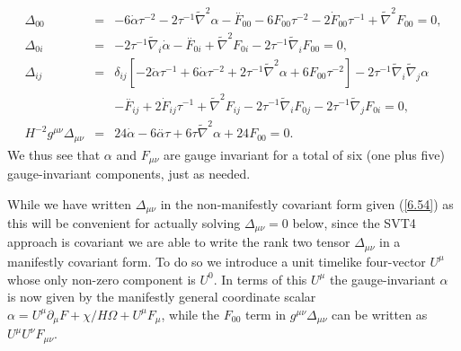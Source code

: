 \documentclass[aps,onecolumn,10pt]{revtex4}
\numberwithin{equation}{section}
\numberwithin{equation}{section}
\begin{document}
\begin{eqnarray}
\Delta_{00}&=& -6 \dot{\alpha} \tau^{-2} - 2 \tau^{-1} \tilde{\nabla}^2\alpha - \overset{..}{F}_{00}  - 6 F_{00} \tau^{-2} - 2 \dot{F}_{00} \tau^{-1} + \tilde{\nabla}^2F_{00}=0,
\nonumber\\ 
\Delta_{0i}&=& -2 \tau^{-1} \tilde{\nabla}_{i}\dot{\alpha}- \overset{..}{F}_{0i} +  \tilde{\nabla}^2F_{0i} - 2 \tau^{-1} \tilde{\nabla}_{i}F_{00}=0,
\nonumber\\ 
\Delta_{ij}&=&\delta_{ij} \left[- 2 \ddot{\alpha}\tau^{-1}+  6 \dot{\alpha} \tau^{-2}  + 2\tau^{-1} \tilde{\nabla}^2\alpha + 6 F_{00} \tau^{-2}\right]-2\tau^{-1} \tilde{\nabla}_{i}\tilde{\nabla}_{j}\alpha
\nonumber\\
&& - \overset{..}{F}_{ij}  + 2 \dot{F}_{ij} \tau^{-1} + \tilde{\nabla}^2F_{ij} -2 \tau^{-1} \tilde{\nabla}_{i}F_{0j} - 2 \tau^{-1} \tilde{\nabla}_{j}F_{0i}=0,
\nonumber\\
H^{-2}g^{\mu\nu}\Delta_{\mu\nu} &=& 24\dot{\alpha} - 6  \overset{..}{\alpha} \tau + 6  \tau \tilde{\nabla}^2\alpha +24 F_{00}=0.
\label{6.54}
\end{eqnarray}
%
We thus see that $\alpha$ and $F_{\mu\nu}$ are gauge invariant for a total of six (one plus five) gauge-invariant components, just as needed. 

While we have written $\Delta_{\mu\nu}$ in the non-manifestly covariant form given (\ref{6.54}) as this will be convenient for actually solving $\Delta_{\mu\nu}=0$ below, since the SVT4 approach is covariant we are able to write the rank two  tensor $\Delta_{\mu\nu}$ in a manifestly covariant form. To do so we introduce a unit  timelike four-vector $U^{\mu}$ whose only non-zero component is $U^{0}$. In terms of this $U^{\mu}$ the gauge-invariant $\alpha$ is now given by the manifestly general coordinate scalar $\alpha=U^{\mu}\partial_{\mu}F+\chi/H\Omega+U^{\mu}F_{\mu}$, while the $F_{00}$ term in $g^{\mu\nu}\Delta_{\mu\nu}$ can be written as $U^{\mu}U^{\nu}F_{\mu\nu}$.
 
\end{document}
